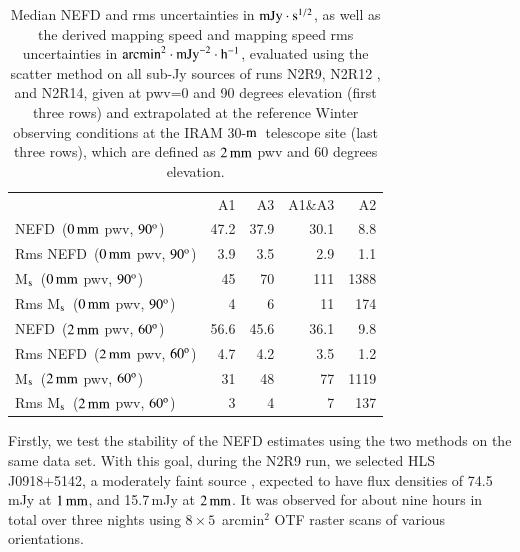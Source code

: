 \documentclass[traditionalabstract]{aa}
\newcommand{\hls}{HLS\,J0918+5142}
\newcommand{\trentemetre}{30-$\rm{m}$}
\begin{document}
{\begin{table}[!thbp]
  \begin{center}
    \caption[NEFD estimates on all sub-Jy sources]{Median NEFD and rms
      uncertainties in $\rm{mJy}\cdot s^{1/2}$, as well as the derived mapping
      speed and mapping speed rms uncertainties in
    $\rm{arcmin}^2\cdot \rm{mJy}^{-2}\cdot\rm{h}^{-1}$, evaluated
using the scatter method on all sub-Jy sources of runs N2R9, N2R12
,      and N2R14, given at pwv=0 and 90 degrees elevation (first three rows) and extrapolated at the
      reference Winter observing conditions at the IRAM
      \trentemetre\ telescope site (last three rows), which are defined
      as $2\,\rm{mm}$ pwv and 60 degrees elevation.}
    \label{tab:nefd_astro}
    \begin{tabular}{lrrrr}
      \hline\hline
      \noalign{\smallskip}
                    & A1      &   A3    &   A1\&A3 &    A2 \\
      \noalign{\smallskip}
      \hline
      \noalign{\smallskip}
      NEFD\, \small{($0\,\rm{mm}$ pwv, $90^{\rm{o}}$)}             & 47.2    & 37.9    &    30.1  &    8.8   \\
      Rms NEFD\, \small{($0\,\rm{mm}$ pwv, $90^{\rm{o}}$)}         &  3.9    &  3.5    &     2.9  &    1.1   \\
      M$_{\rm{s}}$\, \small{($0\,\rm{mm}$ pwv, $90^{\rm{o}}$)}      & 45      &  70     &    111   &   1388   \\
      Rms M$_{\rm{s}}$\, \small{($0\,\rm{mm}$ pwv, $90^{\rm{o}}$)}  &  4      &   6     &     11   &    174   \\
      \hline
      \noalign{\smallskip}
      NEFD\, \small{($2\,\rm{mm}$ pwv, $60^{\rm{o}}$)}             & 56.6    & 45.6    &    36.1  &    9.8   \\
      Rms NEFD\, \small{($2\,\rm{mm}$ pwv, $60^{\rm{o}}$)}         &  4.7    & 4.2     &     3.5  &    1.2   \\
      M$_{\rm{s}}$\, \small{($2\,\rm{mm}$ pwv, $60^{\rm{o}}$)}      &  31    & 48       &    77   &   1119   \\
      Rms M$_{\rm{s}}$\, \small{($2\,\rm{mm}$ pwv, $60^{\rm{o}}$)}  &   3    &  4       &     7     &  137   \\
      \hline
    \end{tabular}
\end{center}
\end{table}

Firstly, we test the stability of the NEFD estimates using the two methods on the
same data set. With this goal, during the N2R9 run, we selected \hls, a
moderately faint source \citep{2012A&A...538L...4C}, expected to have
flux densities of 74.5\,mJy at $1\,\rm{mm}$,
and 15.7\,mJy at $2\, \rm{mm}$. %
It was observed for about nine hours in total over three nights using
$8 \times 5$~arcmin$^2$ OTF raster scans of various orientations.\\


}
\end{document}
